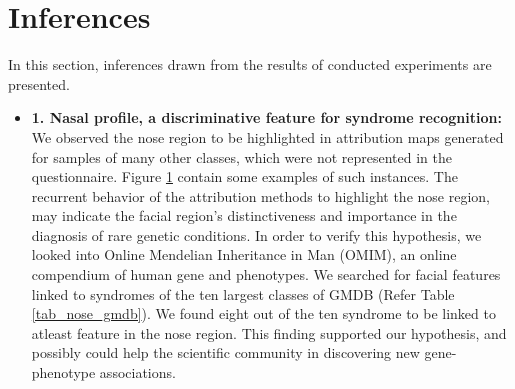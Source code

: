 \documentclass[../report.tex]{subfiles}
\begin{document}
    \section{Inferences}
    In this section, inferences drawn from the results of conducted experiments are presented.  
    \begin{itemize}
    	\item \textbf{1. Nasal profile,  a discriminative feature for syndrome recognition:} We observed the nose region to be highlighted in attribution maps generated for samples of many other classes, which were not represented in the questionnaire. Figure \ref{} contain some examples of such instances.  The recurrent behavior of the attribution methods to highlight the nose region, may indicate the facial region's distinctiveness and importance in the diagnosis of rare genetic conditions. In order to verify this hypothesis, we looked into Online Mendelian Inheritance in Man (OMIM), an online compendium of human gene and phenotypes. We searched for facial features linked to syndromes of the ten largest classes of GMDB (Refer Table \ref{tab_nose_gmdb}). We found eight out of the ten syndrome to be linked to atleast feature in the nose region. This finding supported our hypothesis, and possibly could help the scientific community in discovering new gene-phenotype associations. 
    	

\end{itemize}
\end{document}
